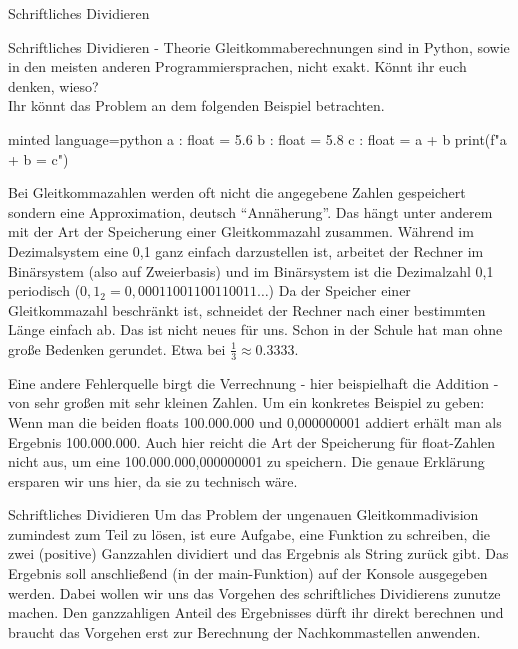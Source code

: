 \begin{task}[points=auto]{Schriftliches Dividieren}
    \begin{subtask*}[points=0]{Schriftliches Dividieren - Theorie }
        Gleitkommaberechnungen sind in Python, sowie in den meisten anderen Programmiersprachen, nicht exakt. Könnt ihr euch denken, wieso?\\
        Ihr könnt das Problem an dem folgenden Beispiel betrachten.
        \begin{codeBlock}[]{minted language=python}
            a : float = 5.6
            b : float = 5.8
            c : float = a + b
            print(f"{a} + {b} = {c}")
        \end{codeBlock}

        \begin{solution}
            Bei Gleitkommazahlen werden oft nicht die angegebene Zahlen gespeichert sondern eine Approximation, deutsch \enquote{Annäherung}. Das hängt unter anderem mit der Art der Speicherung einer Gleitkommazahl zusammen. Während im Dezimalsystem eine 0,1 ganz einfach darzustellen ist, arbeitet der Rechner im Binärsystem (also auf Zweierbasis) und im Binärsystem ist die Dezimalzahl 0,1 periodisch ($0,1_2=0,00011001100110011 \dots$) Da der Speicher einer Gleitkommazahl beschränkt ist, schneidet der Rechner nach einer bestimmten Länge einfach ab.
            Das ist nicht neues für uns. Schon in der Schule hat man ohne
            große Bedenken gerundet. Etwa bei $\frac13 \approx 0.3333$.

            Eine andere Fehlerquelle birgt die Verrechnung - hier beispielhaft die Addition - von sehr großen mit sehr kleinen Zahlen. Um ein konkretes Beispiel zu geben: Wenn man die beiden floats 100.000.000 und 0,000000001 addiert erhält man als Ergebnis 100.000.000. Auch hier reicht die Art der Speicherung für float-Zahlen nicht aus, um eine 100.000.000,000000001 zu speichern. Die genaue Erklärung ersparen wir uns hier, da sie zu technisch wäre.
        \end{solution}
    \end{subtask*}
    \begin{subtask*}[points=0]{Schriftliches Dividieren }
        Um das Problem der ungenauen Gleitkommadivision zumindest zum Teil zu lösen, ist eure Aufgabe, eine Funktion zu schreiben, die zwei (positive) Ganzzahlen dividiert und das Ergebnis als String zurück gibt. Das Ergebnis soll anschließend (in der main-Funktion) auf der Konsole ausgegeben werden. Dabei wollen wir uns das Vorgehen des schriftliches Dividierens zunutze machen. Den ganzzahligen Anteil des Ergebnisses dürft ihr direkt berechnen und braucht das Vorgehen erst zur Berechnung der Nachkommastellen anwenden.


\end{subtask*}
\end{task}
